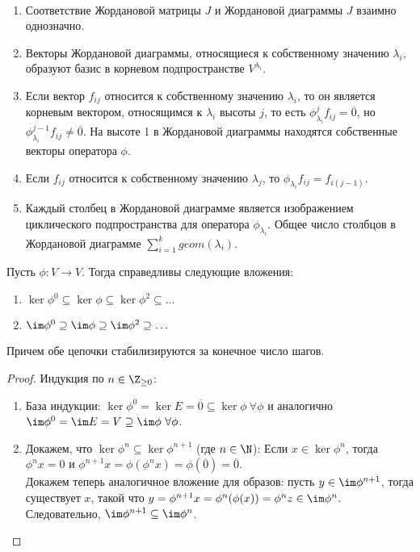 \begin{proposition}~
    \begin{enumerate}
        \item Соответствие Жордановой матрицы $J$ и Жордановой диаграммы $J$ взаимно однозначно.
        \item Векторы Жордановой диаграммы, относящиеся к собственному значению $\lambda_i$, образуют базис 
        в корневом подпространстве $V^{\lambda_i}$.
        \item Если вектор $f_{ij}$ относится к собственному значению $\lambda_i$, 
        то он является корневым вектором, относящимся к $\lambda_i$ высоты $j$, 
        то есть $\phi_{\lambda_i}^j f_{ij} = \overline{0}$, но $\phi_{\lambda_i}^{j-1} f_{ij} \neq \overline{0}$.
        На высоте 1 в Жордановой диаграммы находятся собственные векторы оператора $\phi$.
        \item Если $f_{ij}$ относится к собственному значению $\lambda_{j}$, то $\phi_{\lambda_i} f_{ij} = f_{i(j-1)}$.
        \item Каждый столбец в Жордановой диаграмме является изображением циклического подпространства для оператора $\phi_{\lambda_i}$. Общее число столбцов в Жордановой диаграмме $\displaystyle\sum_{i=1}^{k} geom(\lambda_i)$.
    \end{enumerate}
\end{proposition}

\begin{proposition}
    Пусть $\phi : V \to V$. Тогда справедливы следующие вложения:
    \begin{enumerate}
        \item $\ker \phi^0 \subseteq \ker \phi \subseteq \ker \phi^2 \subseteq \dots$
        \item $\im \phi^0 \supseteq \im \phi \supseteq \im \phi^2 \supseteq \dots$
    \end{enumerate}
    Причем обе цепочки стабилизируются за конечное число шагов.
\end{proposition}

\begin{proof}
    Индукция по $n \in \Z_{\geq 0}$:

    \begin{enumerate}
        \item База индукции: $\ker \phi^0 = \ker E = {\overline{0}} \subseteq \ker \phi \ \forall \phi$ и аналогично $\im \phi^0 = \im E = V \supseteq \im \phi \ \forall \phi$.
        \item Докажем, что $\ker \phi^n \subseteq \ker \phi^{n+1}$ (где $n \in \N$):
        Если $x \in \ker \phi^n$, тогда $\phi^n x = 0$ и $\phi ^{n + 1} x = \phi (\phi ^ n x) = \phi (\overline{0}) = \overline{0}$. \\
        Докажем теперь аналогичное вложение для образов: пусть $y \in \im \phi^{n + 1}$, тогда существует $x$, такой что $y = \phi^{n + 1} x = \phi^n(\phi(x)) = \phi^n z \in \im \phi^n$. Следовательно, $\im \phi^{n + 1} \subseteq \im \phi^n$.
    \end{enumerate}
\end{proof}


